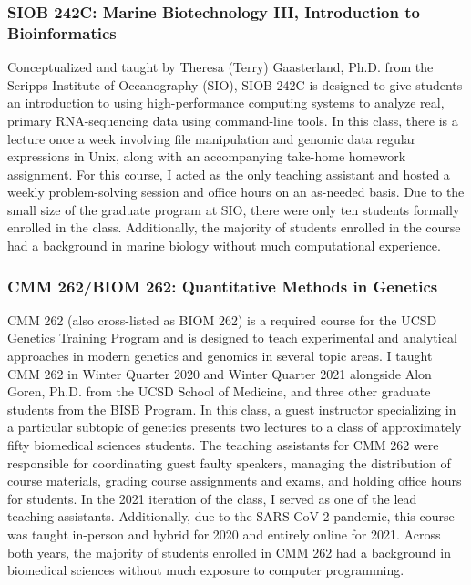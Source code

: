 \subsubsection{SIOB 242C: Marine Biotechnology III, Introduction to Bioinformatics}

Conceptualized and taught by Theresa (Terry) Gaasterland, Ph.D. from the Scripps Institute of Oceanography (SIO), SIOB 242C is designed to give students an introduction to using high-performance computing systems to analyze real, primary RNA-sequencing data using command-line tools. In this class, there is a lecture once a week involving file manipulation and genomic data regular expressions in Unix, along with an accompanying take-home homework assignment. For this course, I acted as the only teaching assistant and hosted a weekly problem-solving session and office hours on an as-needed basis. Due to the small size of the graduate program at SIO, there were only ten students formally enrolled in the class. Additionally, the majority of students enrolled in the course had a background in marine biology without much computational experience.

\subsubsection{CMM 262/BIOM 262: Quantitative Methods in Genetics}
CMM 262 (also cross-listed as BIOM 262) is a required course for the UCSD Genetics Training Program and is designed to teach experimental and analytical approaches in modern genetics and genomics in several topic areas. I taught CMM 262 in Winter Quarter 2020 and Winter Quarter 2021 alongside Alon Goren, Ph.D. from the UCSD School of Medicine, and three other graduate students from the BISB Program. In this class, a guest instructor specializing in a particular subtopic of genetics presents two lectures to a class of approximately fifty biomedical sciences students. The teaching assistants for CMM 262 were responsible for coordinating guest faulty speakers, managing the distribution of course materials, grading course assignments and exams, and holding office hours for students. In the 2021 iteration of the class, I served as one of the lead teaching assistants. Additionally, due to the SARS-CoV-2 pandemic, this course was taught in-person and hybrid for 2020 and entirely online for 2021. Across both years, the majority of students enrolled in CMM 262 had a background in biomedical sciences without much exposure to computer programming.

